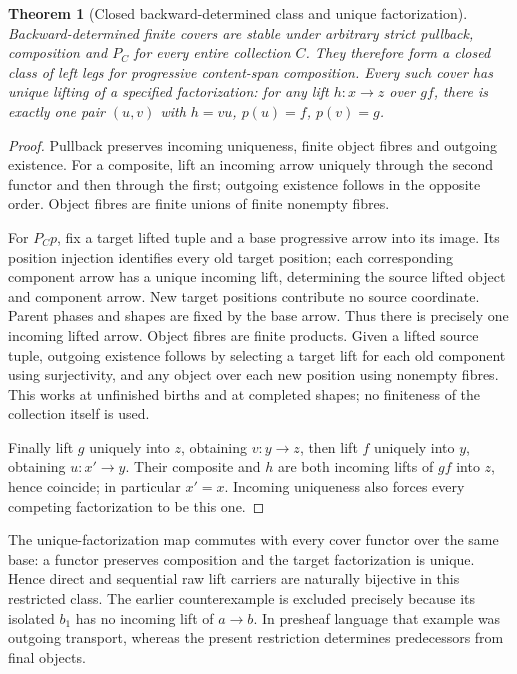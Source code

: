 \documentclass[11pt]{article}
\newtheorem{theorem}{Theorem}\newtheorem{proposition}{Proposition}
\begin{document}
\begin{theorem}[Closed backward-determined class and unique factorization]
Backward-determined finite covers are stable under arbitrary strict pullback, composition and $P_C$ for every entire collection $C$. They therefore form a closed class of left legs for progressive content-span composition. Every such cover has unique lifting of a specified factorization: for any lift $h:x\to z$ over $gf$, there is exactly one pair $(u,v)$ with $h=vu$, $p(u)=f$, $p(v)=g$.
\end{theorem}
\begin{proof}
Pullback preserves incoming uniqueness, finite object fibres and outgoing existence. For a composite, lift an incoming arrow uniquely through the second functor and then through the first; outgoing existence follows in the opposite order. Object fibres are finite unions of finite nonempty fibres.

For $P_Cp$, fix a target lifted tuple and a base progressive arrow into its image. Its position injection identifies every old target position; each corresponding component arrow has a unique incoming lift, determining the source lifted object and component arrow. New target positions contribute no source coordinate. Parent phases and shapes are fixed by the base arrow. Thus there is precisely one incoming lifted arrow. Object fibres are finite products. Given a lifted source tuple, outgoing existence follows by selecting a target lift for each old component using surjectivity, and any object over each new position using nonempty fibres. This works at unfinished births and at completed shapes; no finiteness of the collection itself is used.

Finally lift $g$ uniquely into $z$, obtaining $v:y\to z$, then lift $f$ uniquely into $y$, obtaining $u:x'\to y$. Their composite and $h$ are both incoming lifts of $gf$ into $z$, hence coincide; in particular $x'=x$. Incoming uniqueness also forces every competing factorization to be this one.\end{proof}

The unique-factorization map commutes with every cover functor over the same base: a functor preserves composition and the target factorization is unique. Hence direct and sequential raw lift carriers are naturally bijective in this restricted class. The earlier counterexample is excluded precisely because its isolated $b_1$ has no incoming lift of $a\to b$. In presheaf language that example was outgoing transport, whereas the present restriction determines predecessors from final objects.
\end{document}
